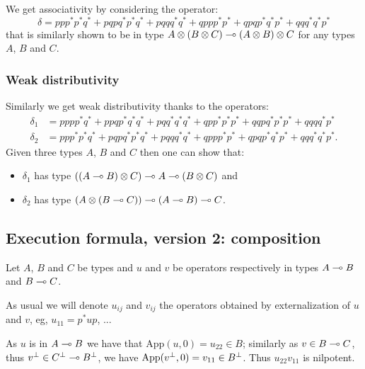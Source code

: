 We get associativity by considering the operator:
\begin{equation*}
\delta = ppp^*p^*q^* + pqpq^*p^*q^* + pqqq^*q^* + qppp^*p^* + qpqp^*q^*p^* + qqq^*q^*p^*
\end{equation*}
that is similarly shown to be in type
\(A\otimes(B\otimes C)\multimap(A\otimes B)\otimes C\) for any types \(A\), \(B\)
and \(C\).

\subsubsection{Weak distributivity}\label{weak-distributivity}

Similarly we get weak distributivity thanks to the operators:
\begin{align*}
\delta_1 & = pppp^*q^* + ppqp^*q^*q^* + pqq^*q^*q^* + qpp^*p^*p^* + qqp q^*p^*p^* + qqq q^*p^* \\
\delta_2 &= ppp^*p^*q^* + pqpq^*p^*q^* + pqqq^*q^* + qppp^*p^* + qpqp^*q^*p^* + qqq^*q^*p^*.
\end{align*}
Given three types \(A\), \(B\) and \(C\) then one can show that:
\begin{itemize}
\item \(\delta_1\) has type \(((A\multimap B)\otimes C)\multimap A\multimap (B\otimes C)\) and
\item \(\delta_2\) has type \((A\otimes(B\multimap C))\multimap (A\multimap B)\multimap C\).
\end{itemize}

\subsection{Execution formula, version 2: composition}\label{execution-formula-version-2-composition}

Let \(A\), \(B\) and \(C\) be types and \(u\) and \(v\) be operators
respectively in types \(A\multimap B\) and \(B\multimap C\).

As usual we will denote \(u_{ij}\) and \(v_{ij}\) the operators obtained
by externalization of \(u\) and \(v\), eg, \(u_{11} = p^*up\), ...

As \(u\) is in \(A\multimap B\) we have that
\(\mathrm{App}(u, 0)=u_{22}\in B\); similarly as \(v\in B\multimap C\), thus
\(v^\bot\in C^\bot\multimap B^\bot\), we have
\(\mathrm{App}(v^\bot, 0) = v_{11}\in B^\bot\). Thus \(u_{22}v_{11}\) is
nilpotent.

